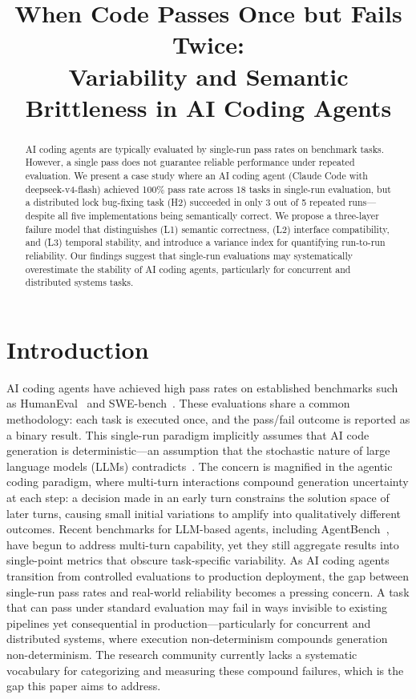 \documentclass[conference]{IEEEtran}
\title{When Code Passes Once but Fails Twice:\\[2pt] Variability and Semantic Brittleness in AI Coding Agents}
\author{\IEEEauthorblockN{Sun Chengxi}
\IEEEauthorblockA{Independent Researcher\\
3852236135@qq.com}
}
\begin{document}
\maketitle

\begin{abstract}
AI coding agents are typically evaluated by single-run pass rates on benchmark tasks.
However, a single pass does not guarantee reliable performance under repeated evaluation.
We present a case study where an AI coding agent (Claude Code with deepseek-v4-flash) achieved 100\% pass rate across 18 tasks in single-run evaluation, but a distributed lock bug-fixing task (H2) succeeded in only 3 out of 5 repeated runs---despite all five implementations being semantically correct.
We propose a three-layer failure model that distinguishes (L1) semantic correctness, (L2) interface compatibility, and (L3) temporal stability, and introduce a variance index for quantifying run-to-run reliability.
Our findings suggest that single-run evaluations may systematically overestimate the stability of AI coding agents, particularly for concurrent and distributed systems tasks.
\end{abstract}

\section{Introduction}

AI coding agents have achieved high pass rates on established benchmarks such as HumanEval~\cite{chen2021evaluating} and SWE-bench~\cite{jimenez2023swebench}.
These evaluations share a common methodology: each task is executed once, and the pass/fail outcome is reported as a binary result.
This single-run paradigm implicitly assumes that AI code generation is deterministic---an assumption that the stochastic nature of large language models (LLMs) contradicts~\cite{brown2020language}.
The concern is magnified in the agentic coding paradigm, where multi-turn interactions compound generation uncertainty at each step: a decision made in an early turn constrains the solution space of later turns, causing small initial variations to amplify into qualitatively different outcomes.
Recent benchmarks for LLM-based agents, including AgentBench~\cite{liu2023agentbench}, have begun to address multi-turn capability, yet they still aggregate results into single-point metrics that obscure task-specific variability.
As AI coding agents transition from controlled evaluations to production deployment, the gap between single-run pass rates and real-world reliability becomes a pressing concern.
A task that can pass under standard evaluation may fail in ways invisible to existing pipelines yet consequential in production---particularly for concurrent and distributed systems, where execution non-determinism compounds generation non-determinism.
The research community currently lacks a systematic vocabulary for categorizing and measuring these compound failures, which is the gap this paper aims to address.
\end{document}
